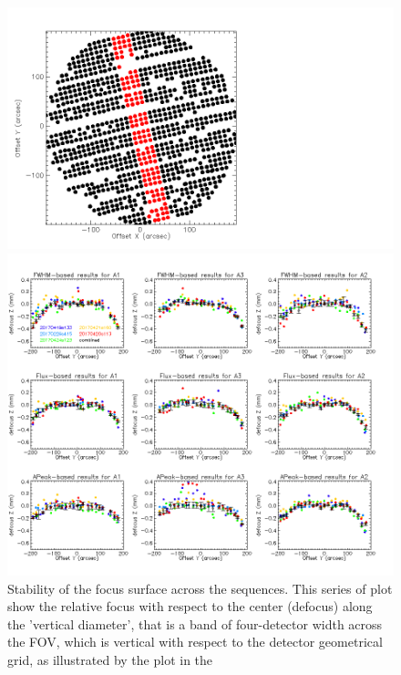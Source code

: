 \begin{figure}
  \includegraphics[trim={-2cm, 2cm, 0, 2cm}, clip, angle=0, scale=0.1]{Figures/fov_focus_stability_check_D1.png}
  \begin{center}
  \includegraphics[trim={0, 2cm, 0, 2cm}, clip, angle=0, scale=0.45]{Figures/fov_focus_1D_Vband_5.png}
  \end{center}
  \caption{Stability of the focus surface across the sequences. This
    series of plot show the relative focus with respect to the center
    (defocus) along the 'vertical diameter', that is a band of
    four-detector width across the FOV, which is vertical with respect to
    the detector geometrical grid, as illustrated by the plot in the
}
\end{figure}
